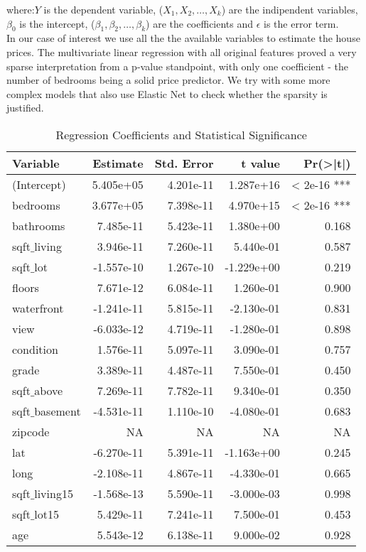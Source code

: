 \documentclass[a4paper, 8pt]{article}
\begin{document}
\begin{multicols}{2}
where:$Y$ is the dependent variable, ($X_1, X_2,\dots,X_k$) are the indipendent variables, $\beta_0$ is the intercept, ($\beta_1,\beta_2, \dots, \beta_k$) are the coefficients and $\epsilon$ is the error term.\\

In our case of interest we use all the the available variables to estimate the house prices.
The multivariate linear regression with all original features proved a very sparse interpretation from a p-value standpoint, with only one coefficient - the number of bedrooms being a solid price predictor. We try with some more complex models that also use Elastic Net to check whether the sparsity is justified.
\begin{table}[ht]
\centering
\begin{tabular}{|l|r|r|r|r|}
\hline
\textbf{Variable} & \textbf{Estimate} & \textbf{Std. Error} & \textbf{t value} & \textbf{Pr(>|t|)} \\
\hline
(Intercept)       & 5.405e+05   & 4.201e-11  & 1.287e+16  & < 2e-16 ***  \\
bedrooms          & 3.677e+05   & 7.398e-11  & 4.970e+15  & < 2e-16 ***  \\
bathrooms         & 7.485e-11   & 5.423e-11  & 1.380e+00  & 0.168        \\
sqft$\_$living       & 3.946e-11   & 7.260e-11  & 5.440e-01  & 0.587        \\
sqft$\_$lot          & -1.557e-10  & 1.267e-10  & -1.229e+00 & 0.219        \\
floors            & 7.671e-12   & 6.084e-11  & 1.260e-01  & 0.900        \\
waterfront        & -1.241e-11  & 5.815e-11  & -2.130e-01 & 0.831        \\
view              & -6.033e-12  & 4.719e-11  & -1.280e-01 & 0.898        \\
condition         & 1.576e-11   & 5.097e-11  & 3.090e-01  & 0.757        \\
grade             & 3.389e-11   & 4.487e-11  & 7.550e-01  & 0.450        \\
sqft$\_$above        & 7.269e-11   & 7.782e-11  & 9.340e-01  & 0.350        \\
sqft$\_$basement     & -4.531e-11  & 1.110e-10  & -4.080e-01 & 0.683        \\
zipcode           & NA          & NA         & NA         & NA           \\
lat               & -6.270e-11  & 5.391e-11  & -1.163e+00 & 0.245        \\
long              & -2.108e-11  & 4.867e-11  & -4.330e-01 & 0.665        \\
sqft$\_$living15     & -1.568e-13  & 5.590e-11  & -3.000e-03 & 0.998        \\
sqft$\_$lot15        & 5.429e-11   & 7.241e-11  & 7.500e-01  & 0.453        \\
age               & 5.543e-12   & 6.138e-11  & 9.000e-02  & 0.928        \\
\hline
\end{tabular}
\caption{Regression Coefficients and Statistical Significance}
\end{table}



\end{multicols}
\end{document}
